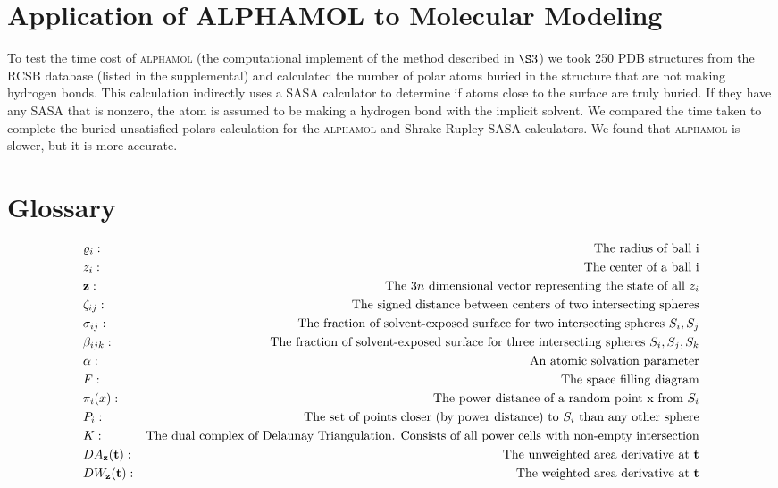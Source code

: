 \documentclass{article}
\begin{document}
\section{Application of ALPHAMOL to Molecular Modeling}
To test the time cost of \textsc{alphamol} (the computational implement of the method described in $\S3$) we took 250 PDB structures from the RCSB database (listed in the supplemental) and calculated the number of polar atoms buried in the structure that are not making hydrogen bonds. This calculation indirectly uses a SASA calculator to determine if atoms close to the surface are truly buried. If they have any SASA that is nonzero, the atom is assumed to be making a hydrogen bond with the implicit solvent. We compared the time taken to complete the buried unsatisfied polars calculation for the \textsc{alphamol} and Shrake-Rupley SASA calculators. We found that \textsc{alphamol} is slower, but it is more accurate.


\section{Glossary}
\begin{align*}
&\varrho_i:&\text{The radius of ball i} \\
&z_i:&\text{The center of a ball i} \\
&{\bf z}:&\text{The $3n$ dimensional vector representing the state of all $z_i$} \\
&\zeta_{ij}:&\text{The signed distance between centers of two intersecting spheres} \\
&\sigma_{ij}:&\text{The fraction of solvent-exposed surface for two intersecting spheres $S_i,S_j$} \\
&\beta_{ijk}:&\text{The fraction of solvent-exposed surface for three intersecting spheres $S_i,S_j, S_k$} \\
&\alpha:&\text{An atomic solvation parameter} \\
&F:&\text{The space filling diagram} \\
&\pi_i(x):&\text{The power distance of a random point x from $S_i$} \\
&P_i:&\text{The set of points closer (by power distance) to $S_i$ than any other sphere} \\
&K:&\text{The dual complex of Delaunay Triangulation. Consists of all power cells with non-empty intersection} \\
&DA_{\bf z}({\bf t}):&\text{The unweighted area derivative at \textbf{t}} \\
&DW_{\bf z}({\bf t}):&\text{The weighted area derivative at \textbf{t}} \\
\end{align*}
\end{document}
